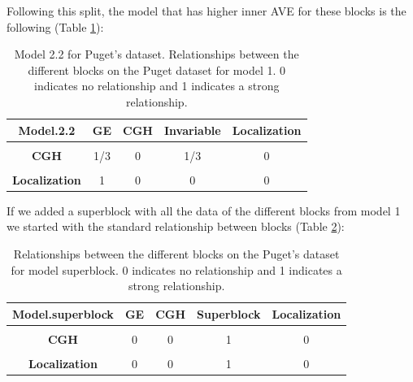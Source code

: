 \documentclass[
  a4paper,
]{book}
\begin{document}
Following this split, the model that has higher inner AVE for these blocks is the following (Table \ref{tab:puget-model2-2}):

\begin{table}[H]

\caption[Model 2.2 for Puget's dataset.]{\label{tab:puget-model2-2}Model 2.2 for Puget's dataset. Relationships between the different blocks on the Puget dataset for model 1. 0 indicates no relationship and 1 indicates a strong relationship.}
\centering
\begin{tabular}[t]{|>{}c|c|c|c|>{}c|}
\hline
\textbf{Model.2.2} & \textbf{GE} & \textbf{CGH} & \textbf{Invariable} & \textbf{Localization}\\
\hline
\textbf{\cellcolor{gray!6}{GE}} & \cellcolor{gray!6}{1} & \cellcolor{gray!6}{1/3} & \cellcolor{gray!6}{0} & \cellcolor{gray!6}{1}\\
\hline
\textbf{CGH} & 1/3 & 0 & 1/3 & 0\\
\hline
\textbf{\cellcolor{gray!6}{Invariable}} & \cellcolor{gray!6}{0} & \cellcolor{gray!6}{1/3} & \cellcolor{gray!6}{0} & \cellcolor{gray!6}{0}\\
\hline
\textbf{Localization} & 1 & 0 & 0 & 0\\
\hline
\end{tabular}
\end{table}

If we added a superblock with all the data of the different blocks from model 1 we started with the standard relationship between blocks (Table \ref{tab:puget-model-superblock}):

\begin{table}[H]

\caption[Model with superblock for Puget's dataset.]{\label{tab:puget-model-superblock}Relationships between the different blocks on the Puget's dataset for model superblock. 0 indicates no relationship and 1 indicates a strong relationship.}
\centering
\begin{tabular}[t]{|>{}c|c|c|c|>{}c|}
\hline
\textbf{Model.superblock} & \textbf{GE} & \textbf{CGH} & \textbf{Superblock} & \textbf{Localization}\\
\hline
\textbf{\cellcolor{gray!6}{GE}} & \cellcolor{gray!6}{0} & \cellcolor{gray!6}{0} & \cellcolor{gray!6}{1} & \cellcolor{gray!6}{0}\\
\hline
\textbf{CGH} & 0 & 0 & 1 & 0\\
\hline
\textbf{\cellcolor{gray!6}{Superblock}} & \cellcolor{gray!6}{1} & \cellcolor{gray!6}{1} & \cellcolor{gray!6}{0} & \cellcolor{gray!6}{1}\\
\hline
\textbf{Localization} & 0 & 0 & 1 & 0\\
\hline
\end{tabular}
\end{table}
\end{document}
